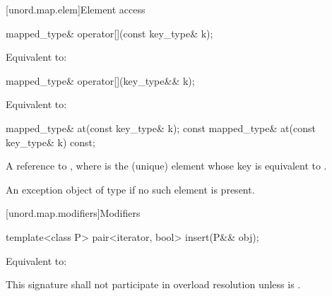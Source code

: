 [unord.map.elem]{Element access}

%
%
\begin{itemdecl}
mapped_type& operator[](const key_type& k);
\end{itemdecl}

\begin{itemdescr}
\pnum
\effects Equivalent to: 
\end{itemdescr}

%
%
\begin{itemdecl}
mapped_type& operator[](key_type&& k);
\end{itemdecl}

\begin{itemdescr}
\pnum
\effects Equivalent to: 
\end{itemdescr}

%
%
\begin{itemdecl}
mapped_type& at(const key_type& k);
const mapped_type& at(const key_type& k) const;
\end{itemdecl}

\begin{itemdescr}
\pnum
\returns A reference to , where  is the (unique) element whose key is equivalent to .

\pnum
\throws An exception object of type  if no such element is present.
\end{itemdescr}

[unord.map.modifiers]{Modifiers}

%
\begin{itemdecl}
template<class P>
  pair<iterator, bool> insert(P&& obj);
\end{itemdecl}

\begin{itemdescr}
\pnum
\effects Equivalent to: 

\pnum
\remarks This signature shall not participate in overload resolution
unless  is .
\end{itemdescr}

